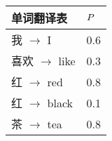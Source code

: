 {\small
\begin{tabular}{l | l}
单词翻译表 & ${P}$ \\ \hline
我 $\to$ I & 0.6 \\
喜欢 $\to$ like & 0.3 \\
红 $\to$ red & 0.8 \\
红 $\to$ black & 0.1 \\
茶 $\to$ tea & 0.8\\
\end{tabular}
}

